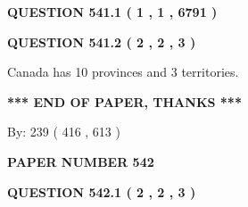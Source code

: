 \documentclass[12pt]{article}
\begin{document}
   
   
   
 \vspace{0.2in}
 
 
 
 
   
   
  
\vspace{0.2in}
  
{\textbf{\Large{QUESTION
541.1 
 ( 1 , 1 , 6791 )
}}}
  
  
  
\vspace{0.2in}
  
{\textbf{\Large{QUESTION
541.2 
 ( 2 , 2 , 3 )
}}}
  
  
 
 
\noindent{}
 
 
Canada has 10  provinces and 3 territories.
 
 
 
 
   
   
 \vspace{0.2in}
 
   
   
   
   
\vspace{1.0in} 
{\textbf{\large{ *** END OF PAPER, THANKS *** }}} 
   
   
\hspace{1.0in} By: 
 239 ( 416 ,  613 )
   
   
   
   
\newpage 
\setcounter{page}{ 
   542001 } 
   
   
   
   
 {\textbf{ \Large{ PAPER NUMBER  542  }}}
   
   
\vspace{0.2in}
   
   
   
   
   
   
 \vspace{0.2in}
 
 
 
 
   
   
  
\vspace{0.2in}
  
{\textbf{\Large{QUESTION
542.1 
 ( 2 , 2 , 3 )
}}}
  
\end{document}

